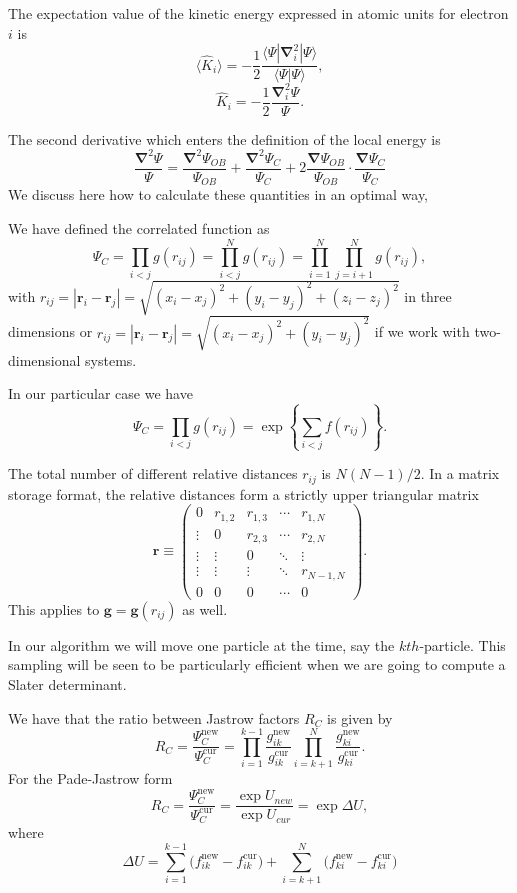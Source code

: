 The expectation value of the kinetic energy expressed in atomic units for electron $i$ is 
\[
 \langle \hat{K}_i \rangle = -\frac{1}{2}\frac{\langle\Psi|\mathbf{\nabla}_{i}^2|\Psi \rangle}{\langle\Psi|\Psi \rangle},
\]
\[
\hat{K}_i = -\frac{1}{2}\frac{\mathbf{\nabla}_{i}^{2} \Psi}{\Psi}.
\]

The second derivative which enters the definition of the local energy is 
\[
\frac{\mathbf{\nabla}^2 \Psi}{\Psi}=\frac{\mathbf{\nabla}^2 \Psi_{OB}}{\Psi_{OB}} + \frac{\mathbf{\nabla}^2  \Psi_C}{ \Psi_C} + 2 \frac{\mathbf{\nabla}  \Psi_{OB}}{\Psi_{OB}}\cdot\frac{\mathbf{\nabla}   \Psi_C}{ \Psi_C}
\]
We discuss here how to calculate these quantities in an optimal way,

We have defined the correlated function as
\[
\Psi_C=\prod_{i< j}g(r_{ij})=\prod_{i< j}^Ng(r_{ij})= \prod_{i=1}^N\prod_{j=i+1}^Ng(r_{ij}),
\]
with 
$r_{ij}=|\mathbf{r}_i-\mathbf{r}_j|=\sqrt{(x_i-x_j)^2+(y_i-y_j)^2+(z_i-z_j)^2}$ in three dimensions or
$r_{ij}=|\mathbf{r}_i-\mathbf{r}_j|=\sqrt{(x_i-x_j)^2+(y_i-y_j)^2}$ if we work with two-dimensional systems.

In our particular case we have
\[
\Psi_C=\prod_{i< j}g(r_{ij})=\exp{\left\{\sum_{i<j}f(r_{ij})\right\}}.
\]

The total number of different relative distances $r_{ij}$ is $N(N-1)/2$. In a matrix storage format, the relative distances  form a strictly upper triangular matrix
\[
 \mathbf{r} \equiv \begin{pmatrix}
  0 & r_{1,2} & r_{1,3} & \cdots & r_{1,N} \\
  \vdots & 0       & r_{2,3} & \cdots & r_{2,N} \\
  \vdots & \vdots  & 0  & \ddots & \vdots  \\
  \vdots & \vdots  & \vdots  & \ddots  & r_{N-1,N} \\
  0 & 0  & 0  & \cdots  & 0
 \end{pmatrix}.
\]
This applies to  $\mathbf{g} = \mathbf{g}(r_{ij})$ as well. 

In our algorithm we will move one particle  at the time, say the $kth$-particle.  This sampling will be seen to be particularly efficient when we are going to compute a Slater determinant. 

We have that the ratio between Jastrow factors $R_C$ is given by
\[
R_{C} = \frac{\Psi_{C}^\mathrm{new}}{\Psi_{C}^\mathrm{cur}} =
\prod_{i=1}^{k-1}\frac{g_{ik}^\mathrm{new}}{g_{ik}^\mathrm{cur}}
\prod_{i=k+1}^{N}\frac{ g_{ki}^\mathrm{new}} {g_{ki}^\mathrm{cur}}.
\]
For the Pade-Jastrow form
\[
 R_{C} = \frac{\Psi_{C}^\mathrm{new}}{\Psi_{C}^\mathrm{cur}} = 
\frac{\exp{U_{new}}}{\exp{U_{cur}}} = \exp{\Delta U},
\]
where
\[
\Delta U =
\sum_{i=1}^{k-1}\big(f_{ik}^\mathrm{new}-f_{ik}^\mathrm{cur}\big)
+
\sum_{i=k+1}^{N}\big(f_{ki}^\mathrm{new}-f_{ki}^\mathrm{cur}\big)
\]

